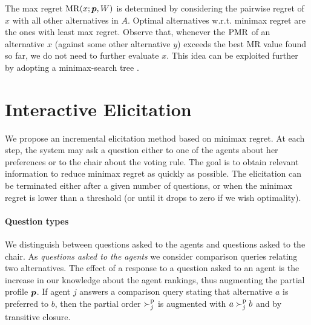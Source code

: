 \documentclass{article}
\begin{document}
The max regret $\operatorname{MR}(x; {\bm{p}}, W)$ is determined by considering the pairwise regret of $x$ with all other alternatives in $A$.
Optimal alternatives w.r.t. minimax regret are the ones with least max regret. 
Observe that, whenever the $\operatorname{PMR}$ of an alternative $x$ (against some other alternative $y$) exceeds the best MR value found so far, we do not need to further evaluate $x$. 
This idea can be exploited further by adopting a minimax-search tree \citep{Braziunas2012}.

\section{Interactive Elicitation} 
\label{sec:elicit}
We propose an incremental elicitation method based on minimax regret.
At each step, the system may ask a question either to one of the agents about her preferences or to the chair about the voting rule. 
The goal is to obtain relevant information to reduce minimax regret as quickly as possible.
The elicitation can be terminated either after a given number of questions, or when the minimax regret is lower than a threshold (or until it drops to zero if we wish optimality).



\paragraph{Question types}
We distinguish between questions asked to the agents and questions asked to the chair.
As {\em questions asked to the agents} we consider comparison queries relating two alternatives.
The effect of a response to a question asked to an agent is the increase in our knowledge about the agent rankings, thus augmenting the partial profile ${\bm{p}}$. 
If agent $j$ answers a comparison query stating that alternative $a$ is preferred to $b$, then the partial order $\succ^\text{p}_j$ is augmented with $a \succ^\text{p}_j b$ and by transitive closure.
\end{document}
